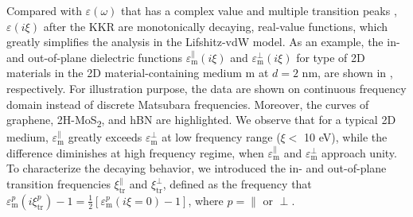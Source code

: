 Compared with $\varepsilon(\omega)$ that has a complex value and
multiple transition peaks ,
$\varepsilon(i \xi)$ after the KKR are monotonically decaying,
real-value functions, which greatly simplifies the analysis in the Lifshitz-vdW model.
%
As an example, the in- and out-of-plane dielectric functions
$\varepsilon_{\mathrm{m}}^{\parallel}(i \xi)$ and
$\varepsilon_{\mathrm{m}}^{\perp}(i \xi)$ for  type of 2D
materials in the 2D material-containing medium m at $d=2$ nm, are
shown in , respectively.
%
For illustration purpose, the data are shown on continuous frequency
domain instead of discrete Matsubara frequencies. Moreover, the curves
of graphene, 2H-MoS\textsubscript{2}, and hBN are
highlighted. 
%
We observe that for a typical 2D medium,
\(\varepsilon_{\mathrm{m}}^{\parallel}\) greatly exceeds
\(\varepsilon_{\mathrm{m}}^{\perp}\) at low frequency range ($\xi <$
10 eV), while the difference diminishes at high frequency regime, when
$\varepsilon_{\mathrm{m}}^{\parallel}$ and
$\varepsilon_{\mathrm{m}}^{\perp}$ approach unity.
%
To characterize the decaying behavior, we introduced the in- and
out-of-plane transition frequencies \(\xi_{\mathrm{tr}}^{\parallel}\)
and \(\xi_{\mathrm{tr}}^{\perp}\), defined as the frequency that
\(\varepsilon_{\mathrm{m}}^{p}(i \xi^{p}_{\mathrm{tr}}) - 1 =
\frac{1}{2}[\varepsilon_{\mathrm{m}}^{p}(i\xi=0) - 1]\), where
$p=\parallel$ or $\perp$.
%

